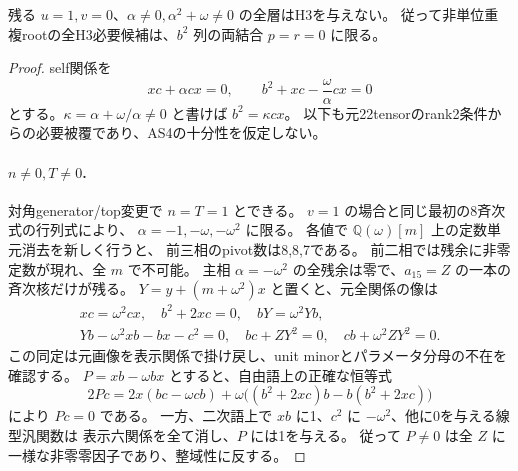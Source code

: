\begin{theorem}[非零比例退化selfも全て空]
\label{thm:cubic-third-root-nonunit-degenerate-self-empty}
残る $u=1,v=0$、$\alpha\ne0,\alpha^2+\omega\ne0$ の全層はH3を与えない。
従って非単位重複rootの全H3必要候補は、$b^2$ 列の両結合 $p=r=0$ に限る。
\end{theorem}
\begin{proof}
self関係を
\[
 xc+\alpha cx=0,\qquad b^2+xc-\frac\omega\alpha cx=0
\tag{S0}
\]
とする。$\kappa=\alpha+\omega/\alpha\ne0$ と書けば $b^2=\kappa cx$。
以下も元22tensorのrank2条件からの必要被覆であり、AS4の十分性を仮定しない。

\paragraph{$n\ne0,T\ne0$.}
対角generator/top変更で $n=T=1$ とできる。
$v=1$ の場合と同じ最初の8斉次式の行列式により、
$\alpha=-1,-\omega,-\omega^2$ に限る。
各値で $\mathbb Q(\omega)[m]$ 上の定数単元消去を新しく行うと、
前三相のpivot数は8,8,7である。
前二相では残余に非零定数が現れ、全 $m$ で不可能。
主相 $\alpha=-\omega^2$ の全残余は零で、$a_{15}=Z$ の一本の斉次核だけが残る。
$Y=y+(m+\omega^2)x$ と置くと、元全関係の像は
\begin{gather*}
 xc=\omega^2cx,\quad b^2+2xc=0,\quad bY=\omega^2Yb,\\
 Yb-\omega^2xb-bx-c^2=0,\quad
 bc+ZY^2=0,\quad cb+\omega^2ZY^2=0.
\end{gather*}
この同定は元画像を表示関係で掛け戻し、unit minorとパラメータ分母の不在を確認する。
$P=xb-\omega bx$ とすると、自由語上の正確な恒等式
\[
 2Pc=2x(bc-\omega cb)+\omega\bigl((b^2+2xc)b-b(b^2+2xc)\bigr)
\]
により $Pc=0$ である。
一方、二次語上で $xb$ に1、$c^2$ に $-\omega^2$、他に0を与える線型汎関数は
表示六関係を全て消し、$P$ には1を与える。
従って $P\ne0$ は全 $Z$ に一様な非零零因子であり、整域性に反する。


\end{proof}
